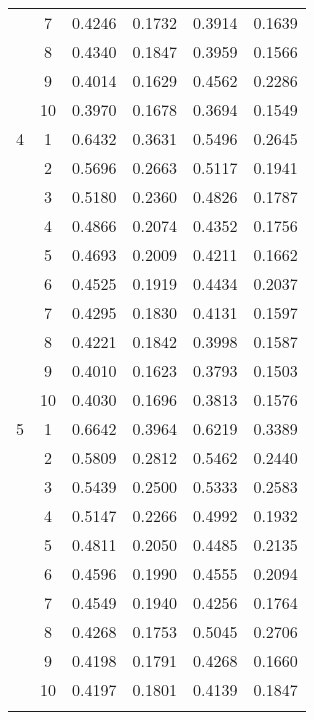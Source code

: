 \begin{center}
\begin{longtable}{|c|c|c|c|c|c|}
 & 7 & 0.4246 & 0.1732 & 0.3914 & 0.1639 \\
 & 8 & 0.4340 & 0.1847 & 0.3959 & 0.1566 \\
 & 9 & 0.4014 & 0.1629 & 0.4562 & 0.2286 \\
 & 10 & 0.3970 & 0.1678 & 0.3694 & 0.1549 \\
\hline
4 & 1 & 0.6432 & 0.3631 & 0.5496 & 0.2645 \\
 & 2 & 0.5696 & 0.2663 & 0.5117 & 0.1941 \\
 & 3 & 0.5180 & 0.2360 & 0.4826 & 0.1787 \\
 & 4 & 0.4866 & 0.2074 & 0.4352 & 0.1756 \\
 & 5 & 0.4693 & 0.2009 & 0.4211 & 0.1662 \\
 & 6 & 0.4525 & 0.1919 & 0.4434 & 0.2037 \\
 & 7 & 0.4295 & 0.1830 & 0.4131 & 0.1597 \\
 & 8 & 0.4221 & 0.1842 & 0.3998 & 0.1587 \\
 & 9 & 0.4010 & 0.1623 & 0.3793 & 0.1503 \\
 & 10 & 0.4030 & 0.1696 & 0.3813 & 0.1576 \\
\hline
5 & 1 & 0.6642 & 0.3964 & 0.6219 & 0.3389 \\
 & 2 & 0.5809 & 0.2812 & 0.5462 & 0.2440 \\
 & 3 & 0.5439 & 0.2500 & 0.5333 & 0.2583 \\
 & 4 & 0.5147 & 0.2266 & 0.4992 & 0.1932 \\
 & 5 & 0.4811 & 0.2050 & 0.4485 & 0.2135 \\
 & 6 & 0.4596 & 0.1990 & 0.4555 & 0.2094 \\
 & 7 & 0.4549 & 0.1940 & 0.4256 & 0.1764 \\
 & 8 & 0.4268 & 0.1753 & 0.5045 & 0.2706 \\
 & 9 & 0.4198 & 0.1791 & 0.4268 & 0.1660 \\
 & 10 & 0.4197 & 0.1801 & 0.4139 & 0.1847 \\
\hline
\label{table:cnn}
\end{longtable}
\end{center}



